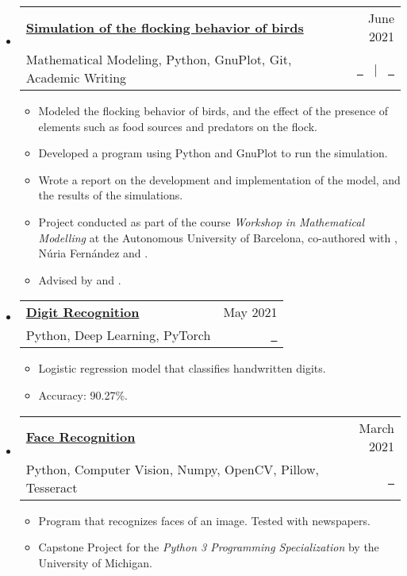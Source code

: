 \documentclass[a4paper,11pt]{article}
\makeatletter
\newcommand{\resumeItemListEnd}{\end{itemize}}
\newcommand{\resumeQuadHeading}[4]{
  \item
  \begin{tabular*}{0.96\textwidth}[t]{l@{\extracolsep{\fill}}r}
    \textbf{#1} & \small #2 \\
    \small#3 & \small #4 \\
  \end{tabular*}
}
\newcommand{\resumeHeadingListStart}{
  \begin{itemize}[leftmargin=0.15in, label={}]
}
\newcommand{\resumeHeadingListEnd}{\end{itemize}}
\makeatother
\begin{document}
  \resumeHeadingListStart{}
    \resumeQuadHeading{\href{https://github.com/loredanasandu/bird-flocks-simulation}{Simulation of the flocking behavior of birds}}{June 2021}{Mathematical Modeling, Python, GnuPlot, Git, Academic Writing}{\href{https://github.com/loredanasandu/bird-flocks-simulation/blob/main/report.pdf}{\faFileTextO \ \graydotuline{{Report \scriptsize (in Catalan)}}} \ $|$ \ \href{https://github.com/loredanasandu/bird-flocks-simulation}{\faGithub \ \graydotuline{Code}}}
    \begin{itemize}[leftmargin=3em, itemsep=0.1em, topsep=2pt]
      \item \small Modeled the flocking behavior of birds, and the effect of the presence of elements such as food sources and predators on the flock.
      \item \small Developed a program using Python and GnuPlot to run the simulation.
      \item \small Wrote a report on the development and implementation of the model, and the results of the simulations.
      \item \small Project conducted as part of the course \textit{Workshop in Mathematical Modelling} at the Autonomous University of Barcelona, co-authored with \href{https://www.linkedin.com/in/anna-danot-14a10b252}{}, Núria Fernández and \href{https://www.linkedin.com/in/jan-mousavi-facundo/}{}.
      \item \small Advised by \href{https://mat.uab.cat/departament/uab/pop_ex.php?id=172&lang=cat}{} and \href{https://mat.uab.cat/departament/uab/pop_ex.php?id=208&lang=}{}.
    \end{itemize}
  \resumeHeadingListEnd{}

  \resumeHeadingListStart{}
    \resumeQuadHeading{\href{https://github.com/loredanasandu/digit-recognition-pytorch}{Digit Recognition}}{May 2021}{Python, Deep Learning, PyTorch}{\href{https://github.com/loredanasandu/digit-recognition-pytorch}{\faGithub \ \graydotuline{Source code}}}
    \begin{itemize}[leftmargin=3em, itemsep=0.1em, topsep=2pt]
      \item \small Logistic regression model that classifies handwritten digits.
      \item \small Accuracy: 90.27\%.
    \end{itemize}
\resumeHeadingListEnd{}

  \resumeHeadingListStart{}
    \resumeQuadHeading{\href{https://github.com/loredanasandu/pillow-tesseract-opencv}{Face Recognition}}{March 2021}{Python, Computer Vision, Numpy, OpenCV, Pillow, Tesseract}{\href{https://github.com/loredanasandu/pillow-tesseract-opencv}{\faGithub \ \graydotuline{Source code}}}
    \begin{itemize}[leftmargin=3em, itemsep=0.1em, topsep=2pt]
      \item \small Program that recognizes faces of an image. Tested with newspapers.
      \item \small Capstone Project for the \textit{Python 3 Programming Specialization} by the University of Michigan.
    \end{itemize}
  \resumeItemListEnd{}
\end{document}
